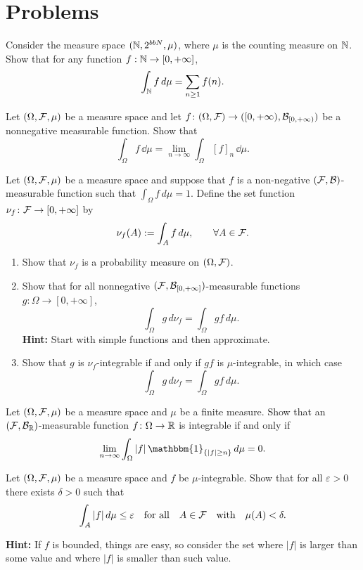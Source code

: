 \section{Problems}

\begin{problem}
	Consider the measure space $(\mathbb N,2^{bbN},\mu)$, where $\mu$ is the counting measure on $\mathbb N$. Show that for any function $f:\mathbb N\to[0,+\infty]$,
	\[
		\int_{\mathbb N} f\,d\mu = \sum_{n\ge 1} f(n).
	\]
\end{problem}

\begin{problem}
	\label{prb:simple-approx-integral}
 Let $(\Omega, \mathcal F, \mu)$ be a measure space and let $f\colon (\Omega,\mathcal F) \to ([0,+\infty), \mathcal B_{[0,+\infty)})$ be a nonnegative measurable function. Show that
\[
\int_\Omega f\, \dd \mu = \lim_{n \to \infty} \int_\Omega [f]_n\, \dd \mu.
\]	
\end{problem}

\begin{problem}\label{prb:measure}
	Let $(\Omega,\mathcal F,\mu)$ be a measure space and suppose that $f$ is a non-negative $(\mathcal F,\mathcal B)$-measurable function such that $\int_\Omega f\,d\mu=1$. Define the set function $\nu_f\colon\mathcal F\to[0,+\infty]$ by
	\[
		\nu_f(A):=\int_A f\,d\mu,\qquad \forall A\in\mathcal F.
	\]
	\begin{enumerate}[label=(\alph*)]
		\item Show that $\nu_f$ is a probability measure on $(\Omega,\mathcal F)$.
		\item Show that for all nonnegative $(\mathcal F,\mathcal B_{[0,+\infty]})$-measurable functions $g\colon\Omega\to [0,+\infty]$,
		\[
			\int_\Omega g\, d\nu_f = \int_\Omega g f\,d\mu.
		\]
		\textbf{Hint:} Start with simple functions and then approximate.
		\item Show that $g$ is $\nu_f$-integrable if and only if $g f$ is $\mu$-integrable, in which case
		\[
			\int_\Omega g\,d\nu_f = \int_\Omega g f\,d\mu.
		\]
	\end{enumerate}
\end{problem}


\begin{problem}
	Let $(\Omega,\mathcal F,\mu)$ be a measure space and $\mu$ be a finite measure. Show that an $(\mathcal F,\mathcal B_{\mathbb R})$-measurable function $f\colon\Omega\to \mathbb R$ is integrable if and only if
	\[
		\lim_{n\to\infty}\int_\Omega |f|\,\mathbbm{1}_{\{|f|\ge n\}}\,d\mu = 0.
	\]
\end{problem}


\begin{problem}
	Let $(\Omega,\mathcal F,\mu)$ be a measure space and $f$ be $\mu$-integrable. Show that for all $\varepsilon>0$ there exists $\delta>0$ such that
	\[
		\int_A |f|\,d\mu\le \varepsilon\quad \text{for all}\quad A\in\mathcal F\quad \text{with}\quad \mu(A)<\delta.
	\]
	
\smallskip
	
	\noindent\textbf{Hint:} If $f$ is bounded, things are easy, so consider the set where $|f|$ is larger than some value and where $|f|$ is smaller than such value.
\end{problem}


